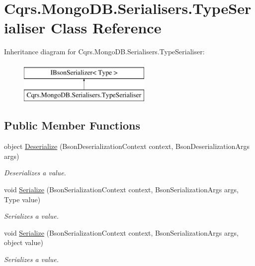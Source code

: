 \hypertarget{classCqrs_1_1MongoDB_1_1Serialisers_1_1TypeSerialiser}{}\section{Cqrs.\+Mongo\+D\+B.\+Serialisers.\+Type\+Serialiser Class Reference}
\label{classCqrs_1_1MongoDB_1_1Serialisers_1_1TypeSerialiser}
Inheritance diagram for Cqrs.\+Mongo\+D\+B.\+Serialisers.\+Type\+Serialiser\+:\begin{figure}[H]
\begin{center}
\leavevmode
\includegraphics[height=2.000000cm]{classCqrs_1_1MongoDB_1_1Serialisers_1_1TypeSerialiser}
\end{center}
\end{figure}
\subsection*{Public Member Functions}
\begin{DoxyCompactItemize}
\item 
object \hyperlink{classCqrs_1_1MongoDB_1_1Serialisers_1_1TypeSerialiser_a5e8aa7ae1372033da215d02b79947b20}{Deserialize} (Bson\+Deserialization\+Context context, Bson\+Deserialization\+Args args)
\begin{DoxyCompactList}\small\item\em Deserializes a value. \end{DoxyCompactList}\item 
void \hyperlink{classCqrs_1_1MongoDB_1_1Serialisers_1_1TypeSerialiser_a4aec60f5df74f482b576f4e0dad0d5f6}{Serialize} (Bson\+Serialization\+Context context, Bson\+Serialization\+Args args, Type value)
\begin{DoxyCompactList}\small\item\em Serializes a value. \end{DoxyCompactList}\item 
void \hyperlink{classCqrs_1_1MongoDB_1_1Serialisers_1_1TypeSerialiser_a2362ae784859054bf5b9281dafeb37cd}{Serialize} (Bson\+Serialization\+Context context, Bson\+Serialization\+Args args, object value)
\begin{DoxyCompactList}\small\item\em Serializes a value. \end{DoxyCompactList}\end{DoxyCompactItemize}
